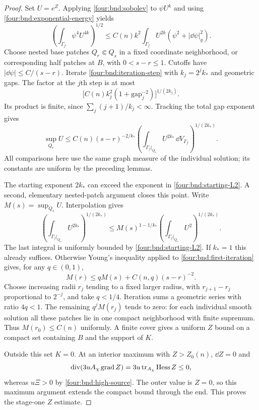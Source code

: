 \begin{proof}
Set $U=e^Z$.  Applying \eqref{four:bnd:sobolev} to $\psi U^k$ and
using \eqref{four:bnd:exponential-energy} yields
\begin{equation}\label{four:bnd:iteration-step}
 \left(\int_{\Gamma_f}\psi^4U^{4k}\right)^{1/2}
 \le C(n)k^2\int_{\Gamma_f}U^{2k}
                      (\psi^2+|\dd\psi|_g^2).
\end{equation}
Choose nested base patches $Q_r\Subset Q_s$ in a fixed coordinate
neighborhood, or corresponding half patches at $B$, with
$0<s-r\le1$.  Cutoffs have $|\dd\psi|\le C/(s-r)$.
Iterate \eqref{four:bnd:iteration-step} with
$k_j=2^jk_*$ and geometric gaps.  The factor at the $j$th step is
at most
\[
 \bigl[C(n)k_j^2(1+\mathrm{gap}_j^{-2})\bigr]^{1/(2k_j)}.
\]
Its product is finite, since $\sum_j(j+1)/k_j<\infty$.
Tracking the total gap exponent gives
\begin{equation}\label{four:bnd:first-iteration}
 \sup_{Q_r}U\le C(n)(s-r)^{-2/k_*}
    \left(\int_{\Gamma_f\vert_{Q_s}}U^{2k_*}
                         \,\dd V_{\Gamma_f}\right)^{1/(2k_*)}.
\end{equation}
All comparisons here use the same graph measure of the individual
solution; its constants are uniform by the preceding lemmas.

The starting exponent $2k_*$ can exceed the exponent in
\eqref{four:bnd:starting-L2}.  A second, elementary nested-patch argument
closes this point.  Write $M(s)=\sup_{Q_s}U$.  Interpolation gives
\[
 \left(\int_{\Gamma_f\vert_{Q_s}}U^{2k_*}\right)^{1/(2k_*)}
 \le M(s)^{1-1/k_*}
       \left(\int_{\Gamma_f\vert_{Q_s}}U^2\right)^{1/(2k_*)}.
\]
The last integral is uniformly bounded by \eqref{four:bnd:starting-L2}.
If $k_*=1$ this already suffices.  Otherwise Young's inequality
applied to \eqref{four:bnd:first-iteration} gives, for any $q\in(0,1)$,
\begin{equation}\label{four:bnd:second-iteration}
 M(r)\le qM(s)+C(n,q)(s-r)^{-2}.
\end{equation}
Choose increasing radii $r_j$ tending to a fixed larger radius,
with $r_{j+1}-r_j$ proportional to $2^{-j}$, and take $q<1/4$.
Iteration sums a geometric series with ratio $4q<1$.
The remaining $q^jM(r_j)$ tends to zero: for each individual
smooth solution all these patches lie in one compact neighborhood
with finite supremum.  Thus $M(r_0)\le C(n)$ uniformly.  A finite
cover gives a uniform $Z$ bound on a compact set containing $B$
and the support of $K$.

Outside this set $K=0$.  At an interior maximum with $Z>Z_0(n)$,
$\dd Z=0$ and
\[
 \operatorname{div}(3uA_\chi\operatorname{grad} Z)=3u\operatorname{tr}_{A_\chi}\operatorname{Hess} Z\le0,
\]
whereas $u\Xi>0$ by \eqref{four:bnd:high-source}.  The outer value
is $Z=0$, so this maximum argument extends the compact bound
through the end.  This proves the stage-one $Z$ estimate.


\end{proof}
